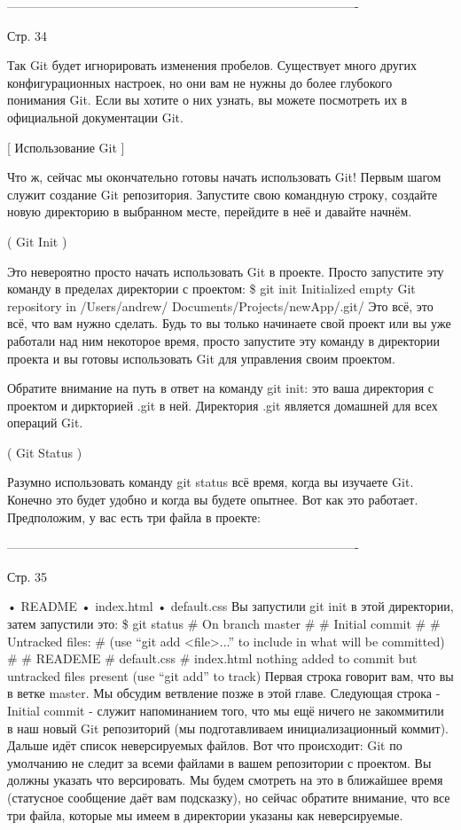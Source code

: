 -------------------------------------------------------------------------------------

Стр. 34

Так Git будет игнорировать изменения пробелов. Существует много других конфигурационных
настроек, но они вам не нужны до более глубокого понимания Git. Если вы хотите о них
узнать, вы можете посмотреть их в официальной документации Git.

[ Использование Git ]

Что ж, сейчас мы окончательно готовы начать использовать Git! Первым шагом служит
создание Git репозитория. Запустите свою командную строку, создайте новую директорию
в выбранном месте, перейдите в неё и давайте начнём.

( Git Init )

Это невероятно просто начать использовать Git в проекте. Просто запустите эту команду
в пределах директории с проектом:
\$ git init
Initialized empty Git repository in /Users/andrew/
Documents/Projects/newApp/.git/
Это всё, это всё, что вам нужно сделать. Будь то вы только начинаете свой проект или 
вы уже работали над ним некоторое время, просто запустите эту команду в директории 
проекта и вы готовы использовать Git для управления своим проектом.

Обратите внимание на путь в ответ на команду git init: это ваша директория с проектом
и диркторией .git в ней. Директория .git является домашней для всех операций Git.

( Git Status )

Разумно использовать команду git status всё время, когда вы изучаете Git. Конечно это
будет удобно и когда вы будете опытнее. Вот как это работает. Предположим, у вас есть 
три файла в проекте:

-------------------------------------------------------------------------------------

Стр. 35

• README
• index.html
• default.css
Вы запустили git init в этой директории, затем запустили это:
\$ git status
# On branch master
#
# Initial commit
#
# Untracked files:
#
(use “git add <file>...” to include in what will be
committed)
#
#    READEME
#    default.css
#    index.html
nothing added to commit but untracked files present (use
“git add” to track)
Первая строка говорит вам, что вы в ветке master. Мы обсудим ветвление позже в этой
главе. Следующая строка - Initial commit - служит напоминанием того, что мы ещё 
ничего не закоммитили в наш новый Git репозиторий (мы подготавливаем 
инициализационный коммит). Дальше идёт список неверсируемых файлов. Вот что происходит:
Git по умолчанию не следит за всеми файлами в вашем репозитории с проектом. Вы должны 
указать что версировать. Мы будем смотреть на это в ближайшее время (статусное сообщение
даёт вам подсказку), но сейчас обратите внимание, что все три файла, которые мы имеем в
директории указаны как неверсируемые.

